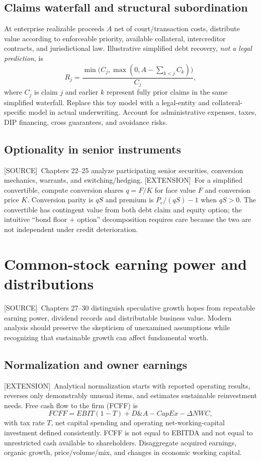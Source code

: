\documentclass[11pt,letterpaper]{article}
\newcommand{\src}{\textsf{\color{sea}[SOURCE]}}
\newcommand{\ext}{\textsf{\color{gold}[EXTENSION]}}
\begin{document}
\subsection{Claims waterfall and structural subordination}
At enterprise realizable proceeds $A$ net of court/transaction costs, distribute value according to enforceable priority, available collateral, intercreditor contracts, and jurisdictional law. Illustrative simplified debt recovery, \emph{not a legal prediction}, is
\[
R_j=\frac{\min\bigl(C_j,\max(0,A-\sum_{k<j} C_k)\bigr)}{C_j},
\]
where $C_j$ is claim $j$ and earlier $k$ represent fully prior claims in the same simplified waterfall. Replace this toy model with a legal-entity and collateral-specific model in actual underwriting. Account for administrative expenses, taxes, DIP financing, cross guarantees, and avoidance risks.

\subsection{Optionality in senior instruments}
\src\ Chapters 22--25 analyze participating senior securities, conversion mechanics, warrants, and switching/hedging. \ext\ For a simplified convertible, compute conversion shares $q=F/K$ for face value $F$ and conversion price $K$. Conversion parity is $qS$ and premium is $P_c/(qS)-1$ when $qS>0$. The convertible has contingent value from both debt claim and equity option; the intuitive ``bond floor + option'' decomposition requires care because the two are not independent under credit deterioration.

\section{Common-stock earning power and distributions}
\src\ Chapters 27--30 distinguish speculative growth hopes from repeatable earning power, dividend records and distributable business value. Modern analysis should preserve the skepticism of unexamined assumptions while recognizing that sustainable growth can affect fundamental worth.

\subsection{Normalization and owner earnings}
\ext\ Analytical normalization starts with reported operating results, reverses only demonstrably unusual items, and estimates sustainable reinvestment needs. Free cash flow to the firm (FCFF) is
\[
FCFF=EBIT(1-T)+D\!\&A-CapEx-\Delta NWC,
\]
with tax rate $T$, net capital spending and operating net-working-capital investment defined consistently. FCFF is not equal to EBITDA and not equal to unrestricted cash available to shareholders. Disaggregate acquired earnings, organic growth, price/volume/mix, and changes in economic working capital.
\end{document}
